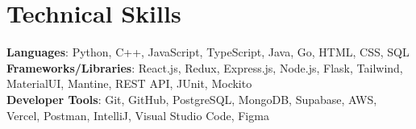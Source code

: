 \section{Technical Skills}
\begin{itemize}[leftmargin=0.15in, label={}]
    \small{\item{     
        \textbf{Languages}{: Python, C++, JavaScript, TypeScript, Java, Go, HTML, CSS, SQL} \\
     
        \textbf{Frameworks/Libraries}{: React.js, Redux, Express.js, Node.js, Flask, Tailwind, MaterialUI, Mantine, REST API, JUnit, Mockito} \\

        \textbf{Developer Tools}{: Git, GitHub, PostgreSQL, MongoDB, Supabase, AWS, Vercel, Postman, IntelliJ, Visual Studio Code, Figma} \\
    }}
\end{itemize}